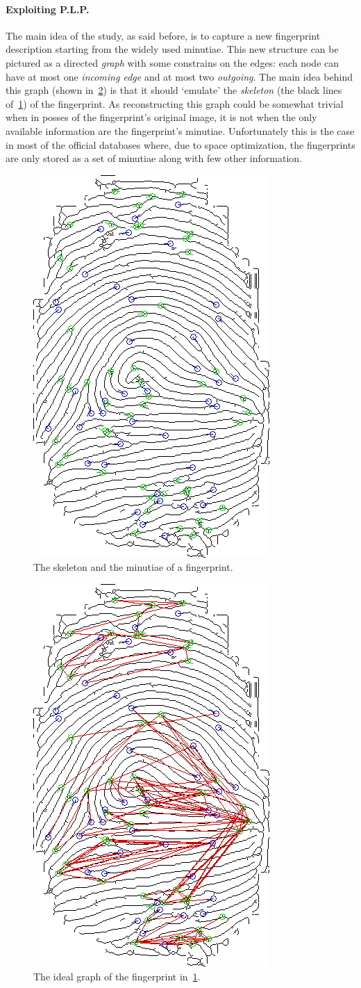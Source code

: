\documentclass[8pt]{article}
\begin{document}
  \paragraph{Exploiting P.L.P.}
    The main idea of the study, as said before, is to capture a new fingerprint description starting from the widely used minutiae.
    This new structure can be pictured as a directed \textit{graph} with some constrains on the edges: each node can have at most one \textit{incoming edge} and at most two \textit{outgoing}.
    The main idea behind this graph (shown in~\cref{fig:ske_min_graph}) is that it should \textquoteleft emulate' the \textit{skeleton} (the black lines of~\cref{fig:ske_min}) of the fingerprint.
    As reconstructing this graph could be somewhat trivial when in posses of the fingerprint's original image, it is not when the only available information are the fingerprint's minutiae.
    Unfortunately this is the case in most of the official databases where, due to space optimization, the fingerprints are only stored as a set of minutiae along with few other information.
    
   	\begin{figure}
    	\centering
    	\includegraphics[width=0.35\linewidth]{img/ske_min}
    	\caption{The skeleton and the minutiae of a fingerprint.}
    	\label{fig:ske_min}
    \end{figure}
    
    \begin{figure}
    	\centering
    	\includegraphics[width=0.35\linewidth]{img/ske_min_graph}
    	\caption{The ideal graph of the fingerprint in~\cref{fig:ske_min}.}
    	\label{fig:ske_min_graph}
    \end{figure}%
    
\end{document}

